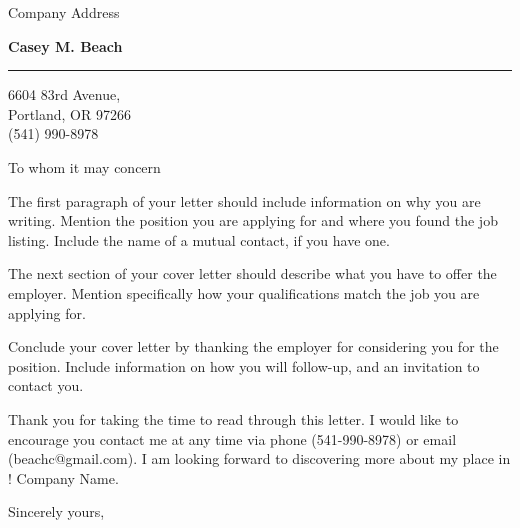 \documentclass{letter} %
\begin{document}
\signature{Casey M. Beach}           %
\longindentation=0pt                       %
\let\raggedleft\raggedright                %
 
 
\begin{letter}{
    Company Address
}

\begin{center}
{\large\bf Casey M. Beach}
\end{center}
\medskip\hrule height 1pt
\begin{center}
6604 83rd Avenue,\\
Portland, OR 97266 \\
(541) 990-8978 
\end{center} 
\vspace{1in}

 
\opening{To whom it may concern} 
\begin{flushleft} 

\noindent The first paragraph of your letter should include information on why 
you are writing. Mention the position you are applying for and where you found 
the job listing. Include the name of a mutual contact, if you have one.

\noindent The next section of your cover letter should describe what you have 
to offer the employer. Mention specifically how your qualifications match the 
job you are applying for.

\noindent Conclude your cover letter by thanking the employer for considering 
you for the position. Include information on how you will follow-up, and an
invitation to contact you.

\noindent Thank you for taking the time to read through this letter. I would like to encourage you
contact me at any time via phone (541-990-8978) or email (beachc@gmail.com). I am looking forward to 
discovering more about my place in \ChangeThis! Company Name.



\end{flushleft}
\closing{Sincerely yours,} 
\vfill
\end{letter}
\end{document}
